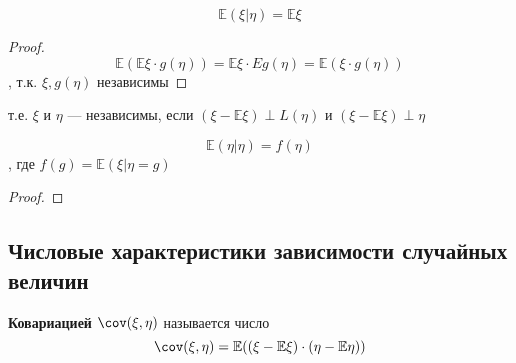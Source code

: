 \begin{prop}
\begin{enumerate}
              \[ \mathbb{E}(\xi | \eta) = \mathbb{E}\xi \]
              \begin{proof}
                  \[ \mathbb{E}(\mathbb{E}\xi \cdot g(\eta)) = \mathbb{E}\xi \cdot Eg(\eta) = \mathbb{E}(\xi \cdot g(\eta)) \]
                  , т.к. \(\xi, g(\eta)\) независимы
              \end{proof}
              \begin{remark}
                  т.е. \(\xi\) и \(\eta\) --- независимы, если \((\xi - \mathbb{E}\xi) \perp L(\eta)\) и \((\xi - \mathbb{E}\xi)\perp \eta\)
              \end{remark}
              \begin{remark}
                  \[ \mathbb{E}(\eta | \eta) = f(\eta) \]
                  , где \(f(g) = \mathbb{E}(\xi | \eta = g)\)
              \end{remark}
              \begin{proof}
                  \unfinished
              \end{proof}
    \end{enumerate}
\end{prop}

\subsection{Числовые характеристики зависимости случайных величин}

\begin{definition}
    \textbf{Ковариацией} \(\cov(\xi, \eta)\) называется число
    \[ \cov(\xi, \eta) =\mathbb{E}((\xi -\mathbb{E}\xi)\cdot(\eta - \mathbb{E}\eta)) \]
\end{definition}

